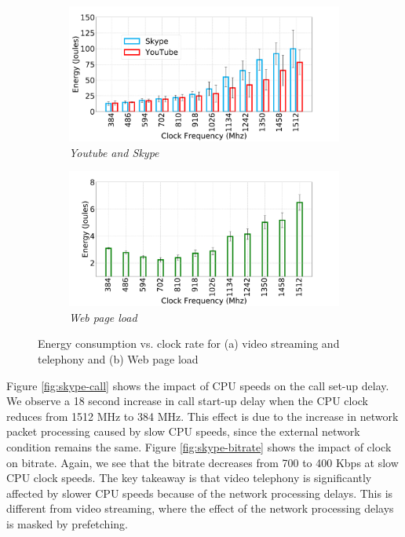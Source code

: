 \begin{figure}
    \begin{subfigure}[b]{0.5\textwidth}
        \centering
        \includegraphics[width=1\linewidth]{sections/device-work/power-video}
    	 \caption{\textit{Youtube and Skype}}
    \end{subfigure}
    \begin{subfigure}[b]{0.5\textwidth}
        \centering
        \includegraphics[width=1\linewidth]{sections/device-work/power-plt}
   	\caption{\textit{Web page load}}
    \end{subfigure}
  \caption{Energy consumption vs. clock rate for (a) video streaming and telephony and (b) Web page load}
  \label{fig:power-video-web}
  \vspace{-0.15in}
\end{figure}




Figure \ref{fig:skype-call} shows the impact of CPU speeds on the call set-up delay.
We observe a 18 second increase in call start-up delay when the CPU clock reduces from 1512 MHz to 384 MHz. This effect is due to the increase in network packet processing caused by slow CPU speeds, since the external network condition remains the same. Figure \ref{fig:skype-bitrate} shows the impact of clock on bitrate. 
Again, we see that the bitrate decreases from 700 to 400 Kbps at slow CPU clock speeds. The key takeaway is that video telephony is significantly affected by slower CPU speeds because of the network processing delays. This is different from video streaming, where the effect of the network processing delays is masked by prefetching.


